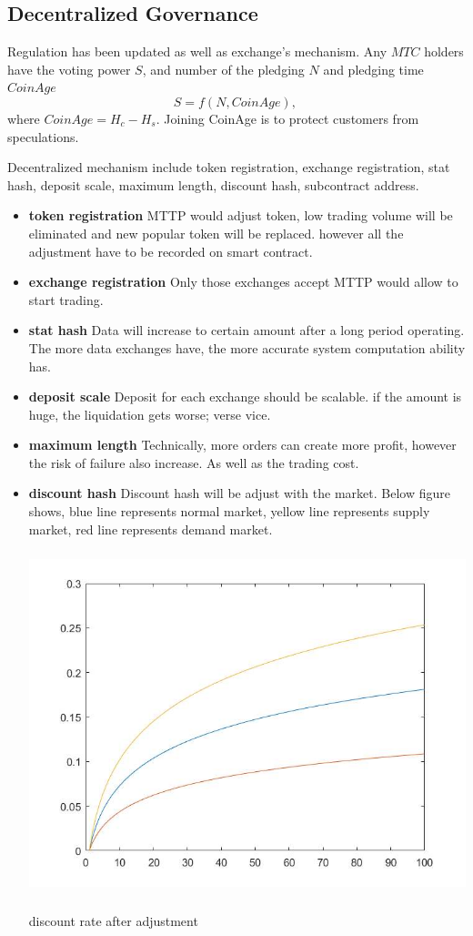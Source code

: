 \documentclass[UTF8,nofonts]{article}
\makeatletter
\newenvironment{figurehere}
 {\def\@captype{figure}}
 {}
\makeatother
\begin{document}
\subsection{Decentralized Governance}
Regulation has been updated as well as exchange's mechanism. Any $MTC$ holders have the voting power $S$, and number of the pledging $N$ and pledging time $CoinAge$
$$S = f(N,  CoinAge)\text{, }$$
where $CoinAge = H_{c}-H_{s}$. Joining CoinAge is to protect customers from speculations.

Decentralized mechanism include token registration, exchange registration, stat hash, deposit scale, maximum length, discount hash, subcontract address.
 \begin{itemize}
   \item \textbf{token registration} MTTP would adjust token,  low trading volume will be eliminated and new popular token will be replaced. however all the adjustment have to be recorded on smart contract.
  \item \textbf{exchange registration} Only those exchanges accept MTTP would allow to start trading.
   \item \textbf{stat hash} Data will increase to certain amount after a long period operating. The more data exchanges have,  the more accurate system computation ability has.
  \item \textbf{deposit scale} Deposit for each exchange should be scalable. if the amount is huge,  the liquidation gets worse; verse vice.
   \item \textbf{maximum length} Technically, more orders can create more profit,  however the risk of failure also increase. As well as the trading cost.
   \item \textbf{discount hash} Discount hash will be adjust with the market. Below figure shows, blue line represents normal market, yellow line represents supply market, red line represents demand market.
\begin{center}
\begin{figurehere}
\includegraphics[height=10cm]{images/rate_adjust.jpg}
\caption{discount rate after adjustment}
\label{fig: dischargeRateAdjust}
\end{figurehere}
\end{center}


\end{itemize}
\end{document}
